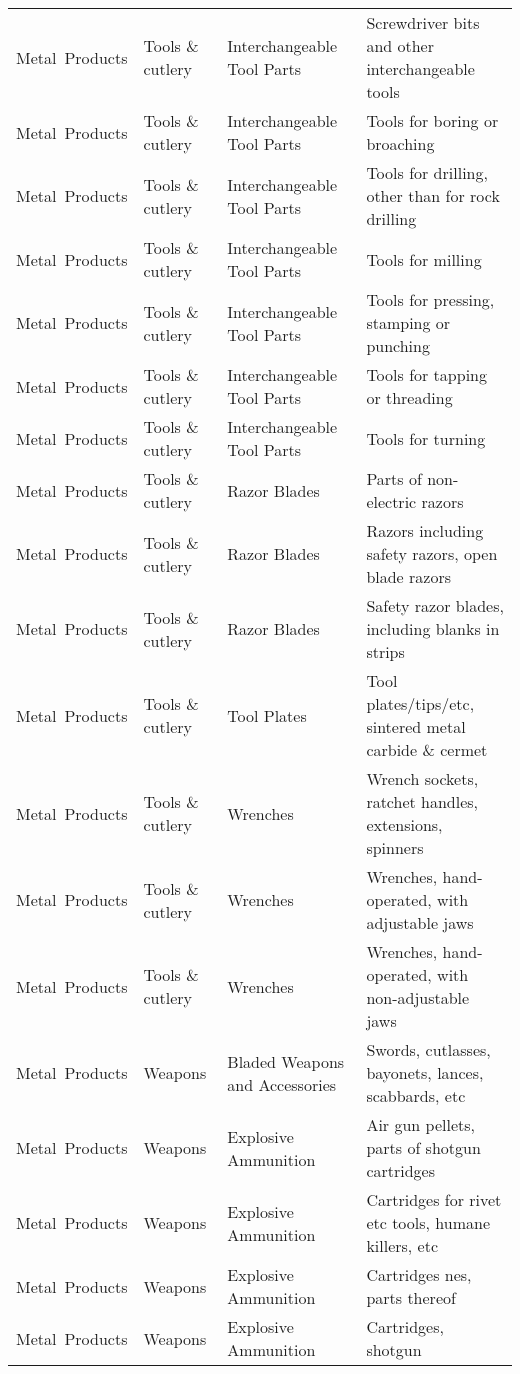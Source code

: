 \begin{appendices}
\begin{xltabular}{\textwidth}{|p{0.10\textwidth}|p{0.25\textwidth}|p{0.20\textwidth}|p{0.35\textwidth}|}
		Metal\ Products & Tools \& cutlery & Interchangeable Tool Parts & Screwdriver bits and other interchangeable tools \\
		Metal\ Products & Tools \& cutlery & Interchangeable Tool Parts & Tools for boring or broaching \\
		Metal\ Products & Tools \& cutlery & Interchangeable Tool Parts & Tools for drilling, other than for rock drilling \\
		Metal\ Products & Tools \& cutlery & Interchangeable Tool Parts & Tools for milling \\
		Metal\ Products & Tools \& cutlery & Interchangeable Tool Parts & Tools for pressing, stamping or punching \\
		Metal\ Products & Tools \& cutlery & Interchangeable Tool Parts & Tools for tapping or threading \\
		Metal\ Products & Tools \& cutlery & Interchangeable Tool Parts & Tools for turning \\
		Metal\ Products & Tools \& cutlery & Razor Blades & Parts of non-electric razors \\
		Metal\ Products & Tools \& cutlery & Razor Blades & Razors including safety razors, open blade razors \\
		Metal\ Products & Tools \& cutlery & Razor Blades & Safety razor blades, including blanks in strips \\
		Metal\ Products & Tools \& cutlery & Tool Plates & Tool plates/tips/etc, sintered metal carbide \& cermet \\
		Metal\ Products & Tools \& cutlery & Wrenches & Wrench sockets, ratchet handles, extensions, spinners \\
		Metal\ Products & Tools \& cutlery & Wrenches & Wrenches, hand-operated, with adjustable jaws \\
		Metal\ Products & Tools \& cutlery & Wrenches & Wrenches, hand-operated, with non-adjustable jaws \\
		Metal\ Products & Weapons & Bladed Weapons and Accessories & Swords, cutlasses, bayonets, lances, scabbards, etc \\
		Metal\ Products & Weapons & Explosive Ammunition & Air gun pellets, parts of shotgun cartridges \\
		Metal\ Products & Weapons & Explosive Ammunition & Cartridges for rivet etc tools, humane killers, etc \\
		Metal\ Products & Weapons & Explosive Ammunition & Cartridges nes, parts thereof \\
		Metal\ Products & Weapons & Explosive Ammunition & Cartridges, shotgun \\

\end{xltabular}
\end{appendices}
